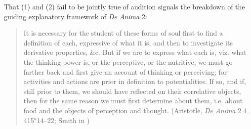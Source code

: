 That (1) and (2) fail to be jointly true of audition signals the breakdown of the guiding explanatory framework of \emph{De Anima} 2: 
\begin{quote}
	It is necessary for the student of these forms of soul first to find a definition of each, expressive of what it is, and then to investigate its derivative properties, \&c. But if we are to express what each is, viz. what the thinking power is, or the perceptive, or the nutritive, we must go farther back and first give an account of thinking or perceiving; for activities and actions are prior in definition to potentialities. If so, and if, still prior to them, we should have reflected on their correlative objects, then for the same reason we must first determine about them, i.e. about food and the objects of perception and thought. (Aristotle, \emph{De Anima} 2 4 415\( ^{a} \)14--22; Smith in \citealt[26]{Barnes:1984uq})
\end{quote}
